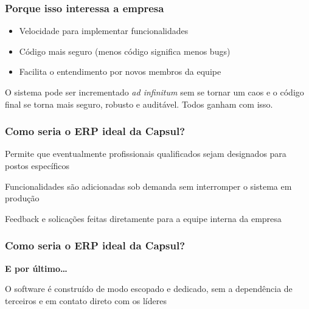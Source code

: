 \documentclass{beamer}
\begin{document}
\begin{frame}
  \frametitle{Porque isso interessa a empresa}
  \begin{itemize}
    \item Velocidade para implementar funcionalidades
    \item Código mais seguro (menos código significa menos bugs)
    \item Facilita o entendimento por novos membros da equipe
  \end{itemize}
  
  \vspace{1.5\baselineskip}
  O sistema pode ser incrementado \textit{ad infinitum} sem se tornar um caos e o código final se torna mais seguro, robusto e auditável. Todos ganham com isso.
\end{frame}

\begin{frame}
  \frametitle{Como seria o ERP ideal da Capsul?}
  \begin{description}[style=nextline,itemsep=2ex]
    \item[Divisão em camadas] Permite que eventualmente profissionais qualificados sejam designados para postos específicos\pause
    \item[Integração contínua (CI)] Funcionalidades são adicionadas sob demanda sem interromper o sistema em produção\pause
    \item[Acompanhamento direto] Feedback e solicações feitas diretamente para a equipe interna da empresa
  \end{description}
\end{frame}

\begin{frame}
  \frametitle{Como seria o ERP ideal da Capsul?}
  \begin{center}
  \textbf{E por último\ldots}
  \end{center}\pause

  \vspace{1.5\baselineskip}
  \begin{description}[style=nextline]
    \item[Fortalece a informatização da empresa] O software é construído de modo escopado e dedicado, sem a dependência de terceiros e em contato direto com os líderes
  \end{description}
\end{frame}
\end{document}

